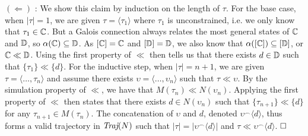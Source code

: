 
$(\Leftarrow)$ : We show this claim by induction on the length of $\tau$. For the base case, when $| \tau | = 1$, we are given $\tau = \langle \tau_{1} \rangle$ where $\tau_{1}$ is unconstrained, i.e. we only know that $\tau_{1} \in \mathbb{C}$. But a Galois connection always relates the most general states of $\mathbb{C}$ and $\mathbb{D}$, so $\alpha(\mathbb{C}) \subseteq \mathbb{D}$. As $[\mathbb{C}] = \mathbb{C}$ and $[\mathbb{D}] = \mathbb{D}$, we also know that $\alpha([\mathbb{C}]) \subseteq [\mathbb{D}]$, or $\mathbb{C} \ll \mathbb{D}$. Using the first property of $\ll$ then tells us that there exists $d \in \mathbb{D}$ such that $\{ \tau_{1} \} \ll \{ d \}$. For the inductive step, when $| \tau | = n + 1$, we are given $\tau = \langle \dots , \tau_{n} \rangle$ and assume there exists $\upsilon = \langle \dots , \upsilon_{n} \rangle$ such that $\tau \ll \upsilon$. By the simulation property of $\ll$, we have that $M(\tau_{n}) \ll N(\upsilon_{n})$. Applying the first property of $\ll$ then states that there exists $d \in N(\upsilon_{n})$ such that $\{ \tau_{n+1} \} \ll \{ d \}$ for any $\tau_{n+1} \in M(\tau_{n})$. The concatenation of $\upsilon$ and $d$, denoted $\upsilon^{\frown}\langle d \rangle$, thus forms a valid trajectory in $\operatorname{\textit{Traj}}(N)$ such that $| \tau | = | \upsilon^{\frown}\langle d \rangle |$ and $\tau \ll \upsilon^{\frown}\langle d \rangle$. $\qedbox$

